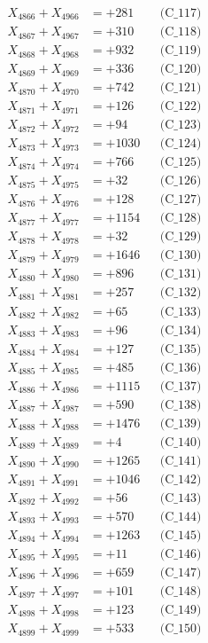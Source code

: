 \documentclass[a4paper,10pt]{article}
\begin{document}
{\begin{align}
X_{4866} + X_{4966} &= +281 && \text{(C\_117)} \\
X_{4867} + X_{4967} &= +310 && \text{(C\_118)} \\
X_{4868} + X_{4968} &= +932 && \text{(C\_119)} \\
X_{4869} + X_{4969} &= +336 && \text{(C\_120)} \\
\allowbreak
X_{4870} + X_{4970} &= +742 && \text{(C\_121)} \\
X_{4871} + X_{4971} &= +126 && \text{(C\_122)} \\
X_{4872} + X_{4972} &= +94 && \text{(C\_123)} \\
X_{4873} + X_{4973} &= +1030 && \text{(C\_124)} \\
X_{4874} + X_{4974} &= +766 && \text{(C\_125)} \\
\allowbreak
X_{4875} + X_{4975} &= +32 && \text{(C\_126)} \\
X_{4876} + X_{4976} &= +128 && \text{(C\_127)} \\
X_{4877} + X_{4977} &= +1154 && \text{(C\_128)} \\
X_{4878} + X_{4978} &= +32 && \text{(C\_129)} \\
X_{4879} + X_{4979} &= +1646 && \text{(C\_130)} \\
\allowbreak
X_{4880} + X_{4980} &= +896 && \text{(C\_131)} \\
X_{4881} + X_{4981} &= +257 && \text{(C\_132)} \\
X_{4882} + X_{4982} &= +65 && \text{(C\_133)} \\
X_{4883} + X_{4983} &= +96 && \text{(C\_134)} \\
X_{4884} + X_{4984} &= +127 && \text{(C\_135)} \\
\allowbreak
X_{4885} + X_{4985} &= +485 && \text{(C\_136)} \\
X_{4886} + X_{4986} &= +1115 && \text{(C\_137)} \\
X_{4887} + X_{4987} &= +590 && \text{(C\_138)} \\
X_{4888} + X_{4988} &= +1476 && \text{(C\_139)} \\
X_{4889} + X_{4989} &= +4 && \text{(C\_140)} \\
\allowbreak
X_{4890} + X_{4990} &= +1265 && \text{(C\_141)} \\
X_{4891} + X_{4991} &= +1046 && \text{(C\_142)} \\
X_{4892} + X_{4992} &= +56 && \text{(C\_143)} \\
X_{4893} + X_{4993} &= +570 && \text{(C\_144)} \\
X_{4894} + X_{4994} &= +1263 && \text{(C\_145)} \\
\allowbreak
X_{4895} + X_{4995} &= +11 && \text{(C\_146)} \\
X_{4896} + X_{4996} &= +659 && \text{(C\_147)} \\
X_{4897} + X_{4997} &= +101 && \text{(C\_148)} \\
X_{4898} + X_{4998} &= +123 && \text{(C\_149)} \\
X_{4899} + X_{4999} &= +533 && \text{(C\_150)} \\
\end{align}
}
\end{document}
